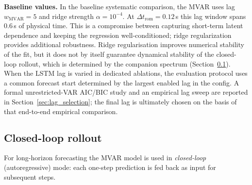 \noindent\textbf{Baseline values.}
In the baseline systematic comparison, the MVAR uses lag
$w_{\mathrm{MVAR}}=5$ and ridge strength
$\alpha=10^{-4}$.  At
$\Delta t_{\mathrm{rom}}=0.12$\,s this lag window spans $0.6$\,s of
physical time.  This is a compromise between capturing short-term latent
dependence and keeping the regression well-conditioned; ridge
regularization provides additional robustness.  Ridge regularisation
improves numerical stability of the fit, but it does not by itself guarantee
dynamical stability of the closed-loop rollout, which is determined by the
companion spectrum (Section~\ref{subsec:mvar_rollout}).  When the LSTM lag is
varied in dedicated ablations, the evaluation protocol uses a common
forecast start determined by the largest enabled lag in the config.
A formal unrestricted-VAR AIC/BIC study and an empirical lag sweep are
reported in Section~\ref{sec:lag_selection}; the final lag is ultimately
chosen on the basis of that end-to-end empirical comparison.

\subsection{Closed-loop rollout}\label{subsec:mvar_rollout}
For long-horizon forecasting the MVAR model is used in \emph{closed-loop}
(autoregressive) mode: each one-step prediction is fed back as input for
subsequent steps.

